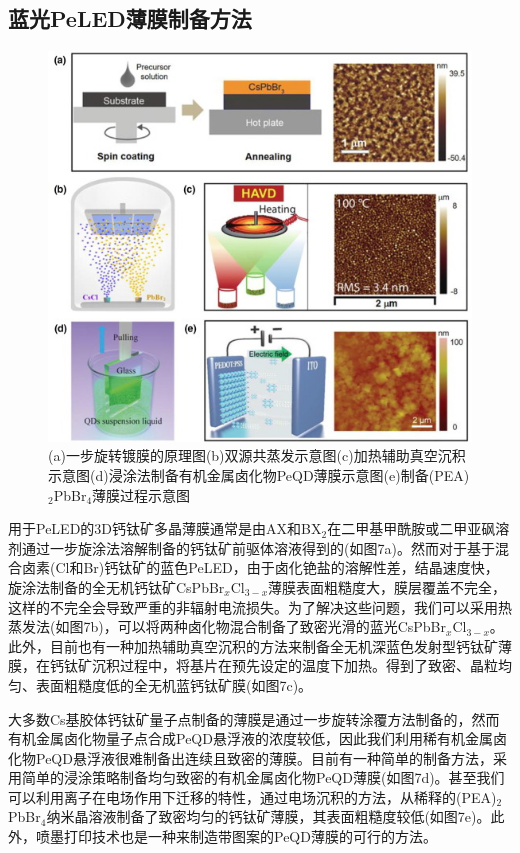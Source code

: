 \documentclass{phyasgn}\usepackage{nag}
\begin{document}
\subsection{蓝光PeLED薄膜制备方法}
\begin{figure}[H]
		\centering
		\hspace{2em}\includegraphics[width=.8\linewidth]{pic/7.jpg}
		\caption{(a)一步旋转镀膜的原理图(b)双源共蒸发示意图(c)加热辅助真空沉积示意图(d)浸涂法制备有机金属卤化物PeQD薄膜示意图(e)制备(PEA)$_{2}$PbBr$_{4}$薄膜过程示意图\cite{zhang2021blue}}
\end{figure}
\par 用于PeLED的3D钙钛矿多晶薄膜通常是由AX和BX$_2$在二甲基甲酰胺或二甲亚砜溶剂通过一步旋涂法溶解制备的钙钛矿前驱体溶液得到的(如图7a)。然而对于基于混合卤素(Cl和Br)钙钛矿的蓝色PeLED，由于卤化铯盐的溶解性差，结晶速度快，旋涂法制备的全无机钙钛矿CsPbBr$_x$Cl$_{3-x}$薄膜表面粗糙度大，膜层覆盖不完全，这样的不完全会导致严重的非辐射电流损失。为了解决这些问题，我们可以采用热蒸发法(如图7b)，可以将两种卤化物混合制备了致密光滑的蓝光CsPbBr$_x$Cl$_{3-x}$。此外，目前也有一种加热辅助真空沉积的方法来制备全无机深蓝色发射型钙钛矿薄膜，在钙钛矿沉积过程中，将基片在预先设定的温度下加热。得到了致密、晶粒均匀、表面粗糙度低的全无机蓝钙钛矿膜(如图7c)。
\par 大多数Cs基胶体钙钛矿量子点制备的薄膜是通过一步旋转涂覆方法制备的，然而有机金属卤化物量子点合成PeQD悬浮液的浓度较低，因此我们利用稀有机金属卤化物PeQD悬浮液很难制备出连续且致密的薄膜。目前有一种简单的制备方法，采用简单的浸涂策略制备均匀致密的有机金属卤化物PeQD薄膜(如图7d)。甚至我们可以利用离子在电场作用下迁移的特性，通过电场沉积的方法，从稀释的(PEA)$_2$PbBr$_4$纳米晶溶液制备了致密均匀的钙钛矿薄膜，其表面粗糙度较低(如图7e)。此外，喷墨打印技术也是一种来制造带图案的PeQD薄膜的可行的方法。
\end{document}
